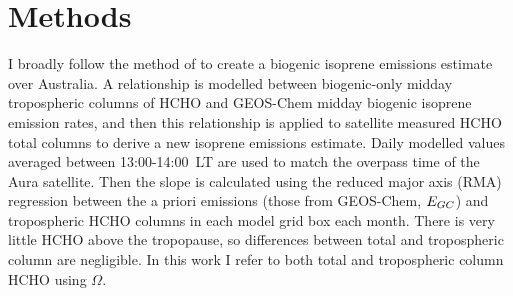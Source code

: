 \section{Methods}
  \label{BioIsop:method}
  
  
  I broadly follow the method of \textcite{Palmer2001} to create a biogenic isoprene emissions estimate over Australia.
  A relationship is modelled between biogenic-only midday tropospheric columns of HCHO and GEOS-Chem midday biogenic isoprene emission rates, and then this relationship is applied to satellite measured HCHO total columns to derive a new isoprene emissions estimate.
  Daily modelled values averaged between 13:00-14:00~LT are used to match the overpass time of the Aura satellite.
  Then the slope is calculated using the reduced major axis (RMA) regression between the a priori emissions (those from GEOS-Chem, $E_{GC}$) and tropospheric HCHO columns in each model grid box each month.
  There is very little HCHO above the tropopause, so differences between total and tropospheric column are negligible.
  In this work I refer to both total and tropospheric column HCHO using $\Omega$.
  
  
